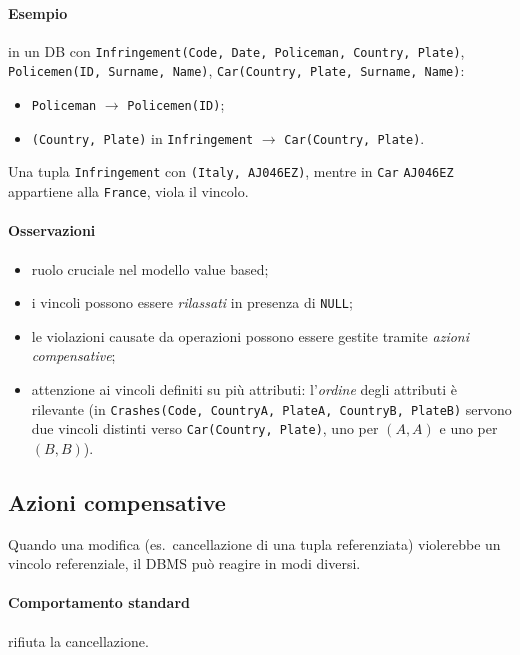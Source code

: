 \documentclass[a4paper,12pt]{article}
\begin{document}
\paragraph{Esempio} in un DB con \texttt{Infringement(Code, Date, Policeman,
Country, Plate)}, \texttt{Policemen(ID, Surname, Name)},
\texttt{Car(Country, Plate, Surname, Name)}:
\begin{itemize}
  \item \texttt{Policeman} $\to$ \texttt{Policemen(ID)};
  \item \texttt{(Country, Plate)} in \texttt{Infringement} $\to$
    \texttt{Car(Country, Plate)}.
\end{itemize}
Una tupla \texttt{Infringement} con \texttt{(Italy, AJ046EZ)}, mentre in
\texttt{Car} \texttt{AJ046EZ} appartiene alla \texttt{France}, viola il
vincolo.

\paragraph{Osservazioni}
\begin{itemize}
  \item ruolo cruciale nel modello value based;
  \item i vincoli possono essere \emph{rilassati} in presenza di \texttt{NULL};
  \item le violazioni causate da operazioni possono essere gestite tramite
    \emph{azioni compensative};
  \item attenzione ai vincoli definiti su più attributi: l'\emph{ordine} degli
    attributi è rilevante (in \texttt{Crashes(Code, CountryA, PlateA, CountryB,
    PlateB)} servono due vincoli distinti verso \texttt{Car(Country, Plate)},
    uno per $(A,A)$ e uno per $(B,B)$).
\end{itemize}

\subsection{Azioni compensative}

Quando una modifica (es.\ cancellazione di una tupla referenziata) violerebbe
un vincolo referenziale, il DBMS può reagire in modi diversi.

\paragraph{Comportamento standard}
\begin{description}[style=nextline]
  \item[Restrict] rifiuta la cancellazione.
\end{description}
\end{document}
